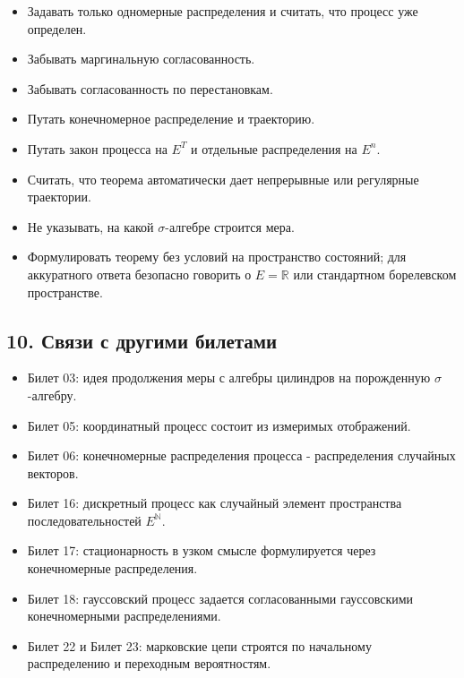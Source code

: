 \documentclass[
  11pt,
  a4paper,
]{article}
\providecommand{\tightlist}{%
  \setlength{\itemsep}{0pt}\setlength{\parskip}{0pt}}
\begin{document}
\begin{itemize}
\tightlist
\item
  Задавать только одномерные распределения и считать, что процесс уже
  определен.
\item
  Забывать маргинальную согласованность.
\item
  Забывать согласованность по перестановкам.
\item
  Путать конечномерное распределение и траекторию.
\item
  Путать закон процесса на \(E^T\) и отдельные распределения на \(E^n\).
\item
  Считать, что теорема автоматически дает непрерывные или регулярные
  траектории.
\item
  Не указывать, на какой \(\sigma\)-алгебре строится мера.
\item
  Формулировать теорему без условий на пространство состояний; для
  аккуратного ответа безопасно говорить о \(E=\mathbb R\) или
  стандартном борелевском пространстве.
\end{itemize}

\subsection{10. Связи с другими
билетами}\label{ux441ux432ux44fux437ux438-ux441-ux434ux440ux443ux433ux438ux43cux438-ux431ux438ux43bux435ux442ux430ux43cux438}

\begin{itemize}
\tightlist
\item
  Билет 03: идея продолжения меры с алгебры цилиндров на порожденную
  \(\sigma\)-алгебру.
\item
  Билет 05: координатный процесс состоит из измеримых отображений.
\item
  Билет 06: конечномерные распределения процесса - распределения
  случайных векторов.
\item
  Билет 16: дискретный процесс как случайный элемент пространства
  последовательностей \(E^{\mathbb N}\).
\item
  Билет 17: стационарность в узком смысле формулируется через
  конечномерные распределения.
\item
  Билет 18: гауссовский процесс задается согласованными гауссовскими
  конечномерными распределениями.
\item
  Билет 22 и Билет 23: марковские цепи строятся по начальному
  распределению и переходным вероятностям.
\end{itemize}
\end{document}
